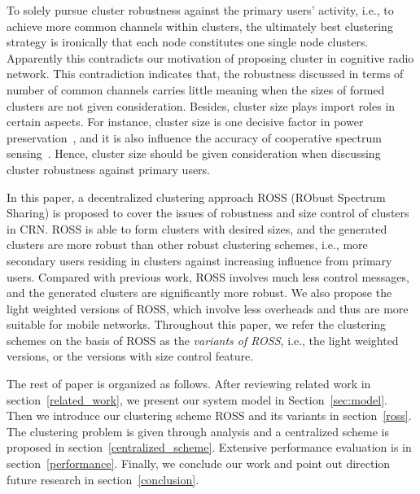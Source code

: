 \documentclass[journal,comsoc]{IEEEtran}
\theoremstyle{mytheoremstyle}
\theoremstyle{mytheoremstyle}
\theoremstyle{mytheoremstyle}
\newcommand{\ie}{i.e., }
\begin{document}
To solely pursue cluster robustness against the primary users' activity, \ie to achieve more common channels within clusters, the ultimately best clustering strategy is ironically that each node constitutes one single node clusters.
Apparently this contradicts our motivation of proposing cluster in cognitive radio network.
This contradiction indicates that, the robustness discussed in terms of number of common channels carries little meaning when the sizes of formed clusters are not given consideration.
Besides, cluster size plays import roles in certain aspects.
For instance, cluster size is one decisive factor in power preservation~\cite{clustering_globecom11, EnergyEfficientClusteringRouting_2015}, and it is also influence the accuracy of cooperative spectrum sensing~\cite{Consensus_based_clustering12}.
Hence, cluster size should be given consideration when discussing cluster robustness against primary users.

In this paper, a decentralized clustering approach ROSS (RObust Spectrum Sharing) is proposed to cover the issues of robustness and size control of clusters in CRN.
ROSS is able to form clusters with desired sizes, and the generated clusters are more robust than other robust clustering schemes, \ie more secondary users residing in clusters against increasing influence from primary users.
Compared with previous work, ROSS involves much less control messages, and the generated clusters are significantly more robust.
We also propose the light weighted versions of ROSS, which involve less overheads and thus are more suitable for mobile networks.
Throughout this paper, we refer the clustering schemes on the basis of ROSS as the \textit{variants of ROSS}, \ie the light weighted versions, or the versions with size control feature. 

The rest of paper is organized as follows. 
After reviewing related work in section~\ref{related_work}, we present our system model in Section~\ref{sec:model}. 
Then we introduce our clustering scheme ROSS and its variants in section~\ref{ross}.
The clustering problem is given through analysis and a centralized scheme is proposed in section~\ref{centralized_scheme}.
Extensive performance evaluation is in section~\ref{performance}.
Finally, we conclude our work and point out direction future research in section~\ref{conclusion}.
\end{document}
